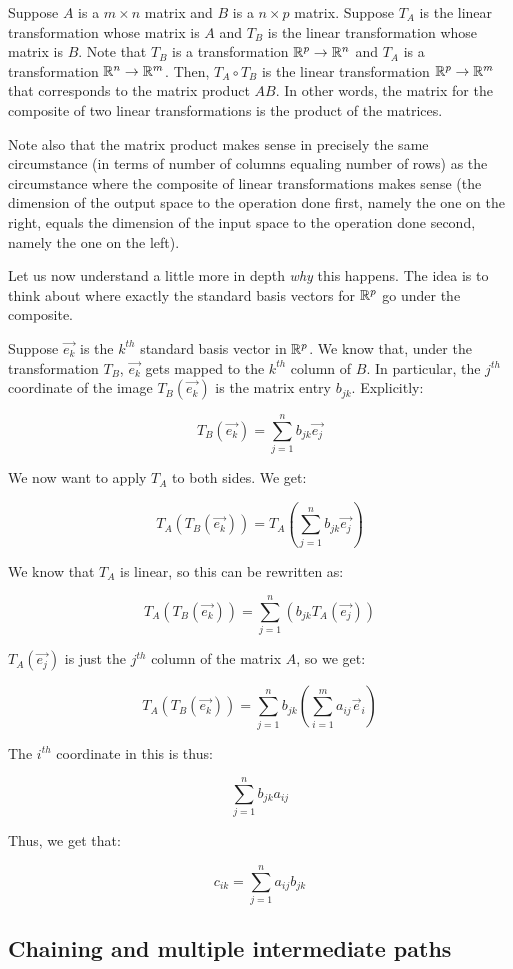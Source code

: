 \documentclass[10pt]{amsart}
\begin{document}
Suppose $A$ is a $m \times n$ matrix and $B$ is a $n \times p$
matrix. Suppose $T_A$ is the linear transformation whose matrix is $A$
and $T_B$ is the linear transformation whose matrix is $B$. Note that
$T_B$ is a transformation $\mathbb{R}^p \to \mathbb{R}^n$ and $T_A$ is a
transformation $\mathbb{R}^n \to \mathbb{R}^m$. Then, $T_A \circ T_B$ is the linear
transformation $\mathbb{R}^p \to \mathbb{R}^m$ that corresponds to the matrix product
$AB$. In other words, the matrix for the composite of two linear
transformations is the product of the matrices.

Note also that the matrix product makes sense in precisely the same
circumstance (in terms of number of columns equaling number of rows)
as the circumstance where the composite of linear transformations
makes sense (the dimension of the output space to the operation done
first, namely the one on the right, equals the dimension of the input
space to the operation done second, namely the one on the left).

Let us now understand a little more in depth {\em why} this
happens. The idea is to think about where exactly the standard basis
vectors for $\mathbb{R}^p$ go under the composite.

Suppose $\vec{e_k}$ is the $k^{th}$ standard basis vector in
$\mathbb{R}^p$. We know that, under the transformation $T_B$, $\vec{e_k}$ gets
mapped to the $k^{th}$ column of $B$. In particular, the $j^{th}$
coordinate of the image $T_B(\vec{e_k})$ is the matrix entry $b_{jk}$. Explicitly:

$$T_B(\vec{e_k}) = \sum_{j=1}^n b_{jk}\vec{e_j}$$

We now want to apply $T_A$ to both sides. We get:

$$T_A(T_B(\vec{e_k})) = T_A\left(\sum_{j=1}^n b_{jk}\vec{e_j}\right)$$

We know that $T_A$ is linear, so this can be rewritten as:

$$T_A(T_B(\vec{e_k})) = \sum_{j=1}^n (b_{jk}T_A(\vec{e_j}))$$

$T_A(\vec{e_j})$ is just the $j^{th}$ column of the matrix $A$, so we get:

$$T_A(T_B(\vec{e_k})) = \sum_{j=1}^n b_{jk}\left( \sum_{i=1}^m a_{ij} \vec{e}_i\right)$$

The $i^{th}$ coordinate in this is thus:

$$\sum_{j=1}^n b_{jk}a_{ij}$$

Thus, we get that:

$$c_{ik} = \sum_{j=1}^n a_{ij}b_{jk}$$

\subsection{Chaining and multiple intermediate paths}
\end{document}
